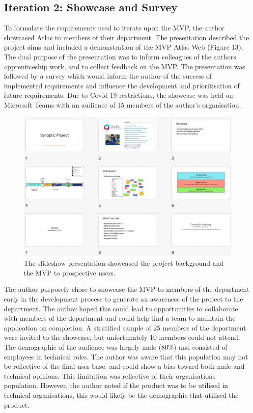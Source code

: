 \documentclass{article}
\begin{document}
\subsection{Iteration 2: Showcase and Survey}

To formulate the requirements used to iterate upon the MVP, the author showcased Atlas to members of their department. The presentation described the project aims and included a demonstration of the MVP Atlas Web (Figure 13). The dual purpose of the presentation was to inform colleagues of the authors apprenticeship work, and to collect feedback on the MVP. The presentation was followed by a survey which would inform the author of the success of implemented requirements and influence the development and prioritisation of future requirements. Due to Covid-19 restrictions, the showcase was held on Microsoft Teams with an audience of 15 members of the author’s organisation. 

\begin{figure}[!htb]
  \centering
      \includegraphics[width=1\textwidth]{images/showcase.png}
  \caption{The slideshow presentation showcased the project background and the MVP  to prospective users.}
\end{figure}

The author purposely chose to showcase the MVP to members of the department early in the development process to generate an awareness of the project to the department. The author hoped this could lead to opportunities to collaborate with members of the department and could help find a team to maintain the application on completion. A stratified sample of 25 members of the department were invited to the showcase, but unfortunately 10 members could not attend. The demographic of the audience was largely male (80\%) and consisted of employees in technical roles. The author was aware that this population may not be reflective of the final user base, and could show a bias toward both male and technical opinions. This limitation was reflective of their organisations population. However, the author noted if the product was to be utilised in technical organisations, this would likely be the demographic that utilised the product.
\end{document}
